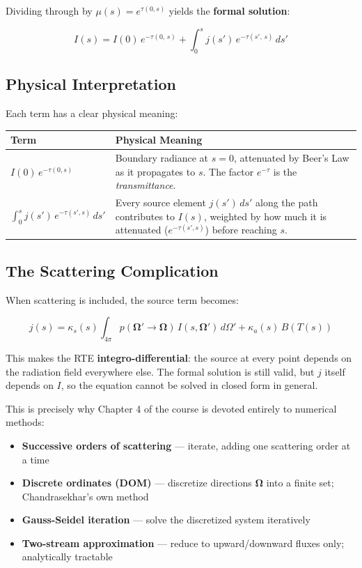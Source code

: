 \documentclass[11pt]{article}
\begin{document}
Dividing through by $\mu(s) = e^{\tau(0,s)}$ yields the \textbf{formal solution}:

\begin{equation}
\boxed{
I(s) = I(0)\, e^{-\tau(0,\,s)}
+ \int_0^s j(s')\, e^{-\tau(s',\,s)}\, ds'
}
\end{equation}

\subsection{Physical Interpretation}

Each term has a clear physical meaning:

\begin{center}
\begin{tabular}{p{5cm} p{8cm}}
\toprule
\textbf{Term} & \textbf{Physical Meaning} \\
\midrule
$I(0)\, e^{-\tau(0,s)}$ &
Boundary radiance at $s=0$, attenuated by Beer's Law as it propagates to $s$.
The factor $e^{-\tau}$ is the \emph{transmittance}. \\[6pt]
$\displaystyle\int_0^s j(s')\, e^{-\tau(s',s)}\, ds'$ &
Every source element $j(s')\,ds'$ along the path contributes to $I(s)$,
weighted by how much it is attenuated ($e^{-\tau(s',s)}$) before reaching $s$. \\
\bottomrule
\end{tabular}
\end{center}

\subsection{The Scattering Complication}

When scattering is included, the source term becomes:

\begin{equation}
j(s) = \kappa_s(s) \int_{4\pi} p(\bm{\Omega}' \to \bm{\Omega})\, I(s, \bm{\Omega}')\, d\Omega'
+ \kappa_a(s)\, B(T(s))
\end{equation}

This makes the RTE \textbf{integro-differential}: the source at every point depends on the
radiation field everywhere else. The formal solution is still valid, but $j$ itself depends on
$I$, so the equation cannot be solved in closed form in general.

This is precisely why Chapter 4 of the course is devoted entirely to numerical methods:

\begin{itemize}
  \item \textbf{Successive orders of scattering} --- iterate, adding one scattering order at a time
  \item \textbf{Discrete ordinates (DOM)} --- discretize directions $\bm{\Omega}$ into a finite set; Chandrasekhar's own method
  \item \textbf{Gauss-Seidel iteration} --- solve the discretized system iteratively
  \item \textbf{Two-stream approximation} --- reduce to upward/downward fluxes only; analytically tractable
\end{itemize}
\end{document}
